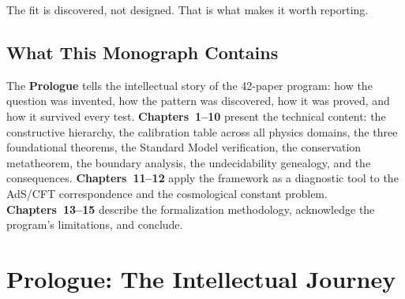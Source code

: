 \documentclass[11pt,a4paper]{report}
\theoremstyle{plain}
\theoremstyle{definition}
\theoremstyle{remark}
\begin{document}
The fit is discovered, not designed. That is what makes it worth reporting.

\section*{What This Monograph Contains}

The \textbf{Prologue} tells the intellectual story of the 42-paper program: how the question was invented, how the pattern was discovered, how it was proved, and how it survived every test. \textbf{Chapters~1--10} present the technical content: the constructive hierarchy, the calibration table across all physics domains, the three foundational theorems, the Standard Model verification, the conservation metatheorem, the boundary analysis, the undecidability genealogy, and the consequences. \textbf{Chapters~11--12} apply the framework as a diagnostic tool to the AdS/CFT correspondence and the cosmological constant problem. \textbf{Chapters~13--15} describe the formalization methodology, acknowledge the program's limitations, and conclude.

\chapter*{Prologue: The Intellectual Journey}
\end{document}

